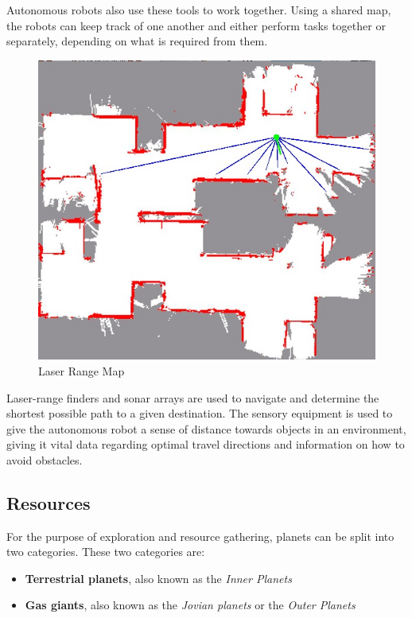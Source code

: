Autonomous robots also use these tools to work together. Using a shared map, the robots can keep track of one another and either perform tasks together or separately, depending on what is required from them.

\begin{figure}[H]
	\centering
	\includegraphics[scale=.7]{images/laserrangemap.jpg}
	\caption{Laser Range Map\cite{laserrangepic}}
	\label{fig:laserrangemap}
\end{figure}

Laser-range finders and sonar arrays are used to navigate and determine the shortest possible path to a given destination. The sensory equipment is used to give the autonomous robot a sense of distance towards objects in an environment, giving it vital data regarding optimal travel directions and information on how to avoid obstacles\cite{lasersonar}.





\subsection{Resources}
For the purpose of exploration and resource gathering, planets can be split into two categories. These two categories are:\cite{planettypes}
\begin{itemize}
	\item{\textbf{Terrestrial planets}, also known as the \textit{Inner Planets}}
	\item{\textbf{Gas giants}, also known as the \textit{Jovian planets} or the \textit{Outer Planets}}
\end{itemize}

